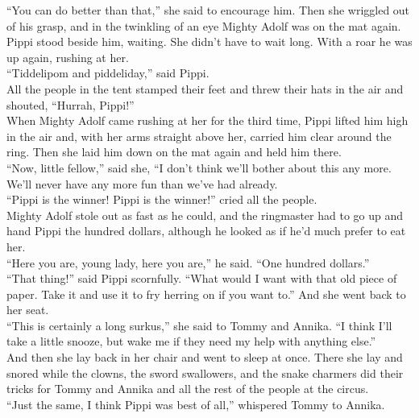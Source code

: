 \documentclass{standard}
\begin{document}
“You can do better than that,” she said to encourage him. Then she wriggled out of his grasp, and in the twinkling of an eye Mighty Adolf was on the mat again. Pippi stood beside him, waiting. She didn’t have to wait long. With a roar he was up again, rushing at her.\\

“Tiddelipom and piddeliday,” said Pippi.\\

All the people in the tent stamped their feet and threw their hats in the air and shouted, “Hurrah, Pippi!”\\

When Mighty Adolf came rushing at her for the third time, Pippi lifted him high in the air and, with her arms straight above her, carried him clear around the ring. Then she laid him down on the mat again and held him there.\\

“Now, little fellow,” said she, “I don’t think we’ll bother about this any more. We’ll never have any more fun than we’ve had already.\\

“Pippi is the winner! Pippi is the winner!” cried all the people.\\

Mighty Adolf stole out as fast as he could, and the ringmaster had to go up and hand Pippi the hundred dollars, although he looked as if he’d much prefer to eat her.\\

“Here you are, young lady, here you are,” he said. “One hundred dollars.”\\

“That thing!” said Pippi scornfully. “What would I want with that old piece of paper. Take it and use it to fry herring on if you want to.” And she went back to her seat.\\

“This is certainly a long surkus,” she said to Tommy and Annika. “I think I’ll take a little snooze, but wake me if they need my help with anything else.”\\

And then she lay back in her chair and went to sleep at once. There she lay and snored while the clowns, the sword swallowers, and the snake charmers did their tricks for Tommy and Annika and all the rest of the people at the circus.\\

“Just the same, I think Pippi was best of all,” whispered Tommy to Annika.
\newpage
\end{document}
